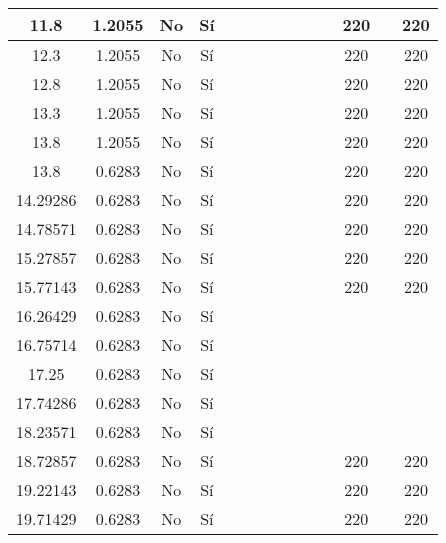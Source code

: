\begin{table}[H]
{\begin{tabular}{|c|c|c|c|c|c|c|c|c|c|c|c|c|c|}
\hline
11.8 & 1.2055 & No  & Sí  &     &     &     &     &     &     &     & 220 &     & 220 \bigstrut\\
\hline
12.3 & 1.2055 & No  & Sí  &     &     &     &     &     &     &     & 220 &     & 220 \bigstrut\\
\hline
12.8 & 1.2055 & No  & Sí  &     &     &     &     &     &     &     & 220 &     & 220 \bigstrut\\
\hline
13.3 & 1.2055 & No  & Sí  &     &     &     &     &     &     &     & 220 &     & 220 \bigstrut\\
\hline
13.8 & 1.2055 & No  & Sí  &     &     &     &     &     &     &     & 220 &     & 220 \bigstrut\\
\hline
13.8 & 0.6283 & No  & Sí  &     &     &     &     &     &     &     & 220 &     & 220 \bigstrut\\
\hline
14.29286 & 0.6283 & No  & Sí  &     &     &     &     &     &     &     & 220 &     & 220 \bigstrut\\
\hline
14.78571 & 0.6283 & No  & Sí  &     &     &     &     &     &     &     & 220 &     & 220 \bigstrut\\
\hline
15.27857 & 0.6283 & No  & Sí  &     &     &     &     &     &     &     & 220 &     & 220 \bigstrut\\
\hline
15.77143 & 0.6283 & No  & Sí  &     &     &     &     &     &     &     & 220 &     & 220 \bigstrut\\
\hline
16.26429 & 0.6283 & No  & Sí  &     &     &     &     &     &     &     &     &     &  \bigstrut\\
\hline
16.75714 & 0.6283 & No  & Sí  &     &     &     &     &     &     &     &     &     &  \bigstrut\\
\hline
17.25 & 0.6283 & No  & Sí  &     &     &     &     &     &     &     &     &     &  \bigstrut\\
\hline
17.74286 & 0.6283 & No  & Sí  &     &     &     &     &     &     &     &     &     &  \bigstrut\\
\hline
18.23571 & 0.6283 & No  & Sí  &     &     &     &     &     &     &     &     &     &  \bigstrut\\
\hline
18.72857 & 0.6283 & No  & Sí  &     &     &     &     &     &     &     & 220 &     & 220 \bigstrut\\
\hline
19.22143 & 0.6283 & No  & Sí  &     &     &     &     &     &     &     & 220 &     & 220 \bigstrut\\
\hline
19.71429 & 0.6283 & No  & Sí  &     &     &     &     &     &     &     & 220 &     & 220 \bigstrut\\

\end{tabular}}
\end{table}
